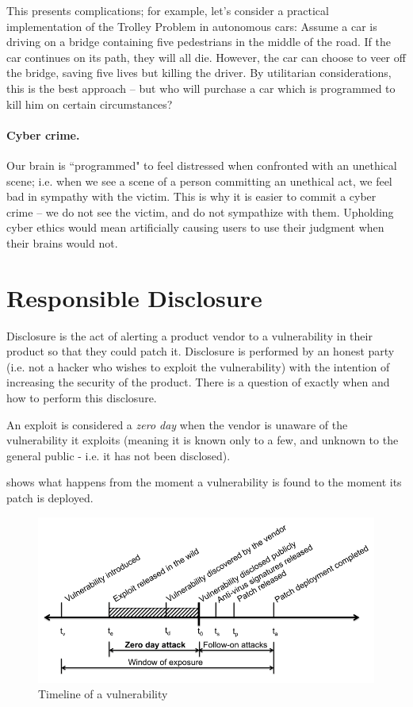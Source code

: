 This presents complications; for example, let's consider a practical
implementation of the Trolley Problem in autonomous cars: Assume a car is
driving on a bridge containing five pedestrians in the middle of the road. If
the car continues on its path, they will all die. However, the car can choose to
veer off the bridge, saving five lives but killing the driver. By utilitarian
considerations, this is the best approach – but who will purchase a car which is
programmed to kill him on certain circumstances?

\paragraph{Cyber crime.} Our brain is ``programmed" to feel distressed when
confronted with an unethical scene; i.e. when we see a scene of a person
committing an unethical act, we feel bad in sympathy with the victim. This is
why it is easier to commit a cyber crime -- we do not see the victim, and do not
sympathize with them. Upholding cyber ethics would mean artificially causing
users to use their judgment when their brains would not.

\section{Responsible Disclosure}
Disclosure is the act of alerting a product vendor to a vulnerability in their
product so that they could patch it. Disclosure is performed by an honest party
(i.e. not a hacker who wishes to exploit the vulnerability) with the intention
of increasing the security of the product. There is a question of exactly when
and how to perform this disclosure.

An exploit is considered a \textit{zero day} when the vendor is unaware of the
vulnerability it exploits (meaning it is known only to a few, and unknown to the
general public - i.e. it has not been disclosed).

 shows what happens from the moment a
vulnerability is found to the moment its patch is deployed.

\begin{figure}[!ht]
    \centering
    \includegraphics[width=\textwidth]{images/Vulnerability_Timeline.PNG}
    \caption{Timeline of a vulnerability} \label{fig:vulnerability_timeline}
\end{figure}

